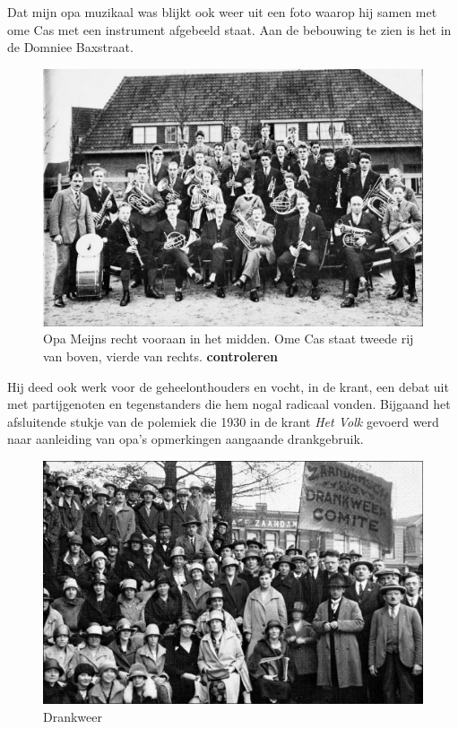 \documentclass[12pt,twoside, openright]{memoir}
\begin{document}
Dat mijn opa muzikaal was blijkt ook weer uit een foto waarop hij samen met ome Cas met een instrument afgebeeld staat. Aan de bebouwing te zien is het in de Domniee Baxstraat.

\begin{figure}
\includegraphics[width=\textwidth]{img/ch2/ch2-afb04}
\caption*{\footnotesize Opa Meijns recht vooraan in het midden. Ome Cas staat tweede rij van boven, vierde van rechts. \textbf{controleren}}
\end{figure}

Hij deed ook werk voor de geheelonthouders en vocht, in de krant, een debat uit met partijgenoten en tegenstanders die hem nogal radicaal vonden. Bijgaand het afsluitende stukje van de polemiek die 1930 in de krant \emph{Het Volk} gevoerd werd naar aanleiding van opa’s opmerkingen aangaande drankgebruik.

\begin{figure}
\includegraphics[width=\textwidth]{img/ch2/ch2-afb06}
\caption*{\footnotesize Drankweer}
\end{figure}
\end{document}
